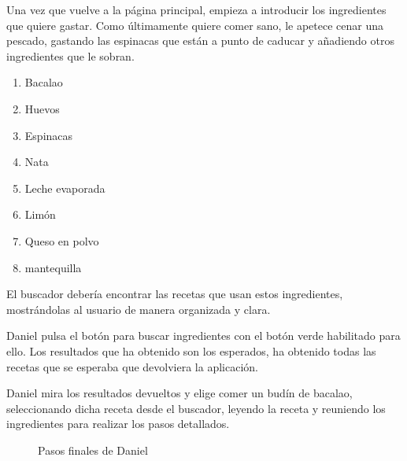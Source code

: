 Una vez que vuelve a la página principal, empieza a introducir los ingredientes que quiere gastar. Como últimamente quiere comer sano, le apetece cenar una pescado, gastando las espinacas que están a punto de caducar y añadiendo otros ingredientes que le sobran.
\begin{enumerate}
    \item Bacalao
    \item Huevos
    \item Espinacas
    \item Nata
    \item Leche evaporada
    \item Limón
    \item Queso en polvo
    \item mantequilla
\end{enumerate}

El buscador debería encontrar las recetas que usan estos ingredientes, mostrándolas al usuario de manera organizada y clara.

Daniel pulsa el botón para buscar ingredientes con el botón verde habilitado para ello. Los resultados que ha obtenido son los esperados, ha obtenido todas las recetas que se esperaba que devolviera la aplicación. 

Daniel mira los resultados devueltos y elige comer un budín de bacalao, seleccionando dicha receta desde el buscador, leyendo la receta y reuniendo los ingredientes para realizar los pasos detallados. 
\begin{figure}[h!]
    \centering
    \caption{Pasos finales de Daniel}
    \label{fig:Daniel-pasos2}
\end{figure}

